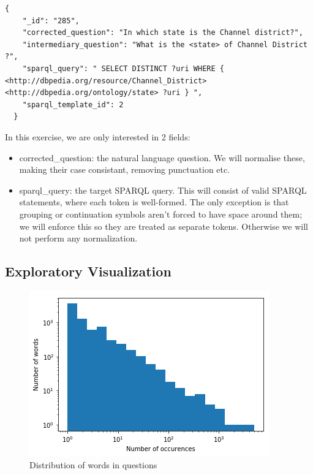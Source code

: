 \documentclass[12pt]{article}
\begin{document}
\begin{lstlisting}[]
  {
    "_id": "285", 
    "corrected_question": "In which state is the Channel district?", 
    "intermediary_question": "What is the <state> of Channel District ?", 
    "sparql_query": " SELECT DISTINCT ?uri WHERE { <http://dbpedia.org/resource/Channel_District> <http://dbpedia.org/ontology/state> ?uri } ", 
    "sparql_template_id": 2
  }
\end{lstlisting}

In this exercise, we are only interested in 2 fields:

\begin{itemize}
  \item 
    corrected\_question: the natural language question. We will normalise these, 
    making their case consistant, removing punctuation etc.
  \item
    sparql\_query: the target SPARQL query. This will consist of valid SPARQL statements,
    where each token is well-formed. The only exception is that grouping or continuation 
    symbols aren't forced to have space around them; we will enforce this so they are treated
    as separate tokens. Otherwise we will not perform any normalization.
\end{itemize}

\subsection{Exploratory Visualization}\label{exploratory-visualization}

\begin{figure}
  \centering
  \includegraphics{images/question_word_distribution.png}
  \caption{Distribution of words in questions}
  \label{fig:question_word_distribution}
\end{figure}
\end{document}

